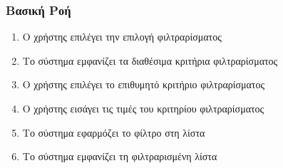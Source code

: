 \documentclass[12pt,a4paper,twoside]{book}
\begin{document}
\subsubsection{Βασική Ροή}
\begin{enumerate}
  \item Ο χρήστης επιλέγει την επιλογή φιλτραρίσματος
  \item Το σύστημα εμφανίζει τα διαθέσιμα κριτήρια φιλτραρίσματος%
  \item Ο χρήστης επιλέγει το επιθυμητό κριτήριο φιλτραρίσματος
  \item Ο χρήστης εισάγει τις τιμές του κριτηρίου φιλτραρίσματος
  \item Το σύστημα εφαρμόζει το φίλτρο στη λίστα
  \item Το σύστημα εμφανίζει τη φιλτραρισμένη λίστα
\end{enumerate}
\end{document}

